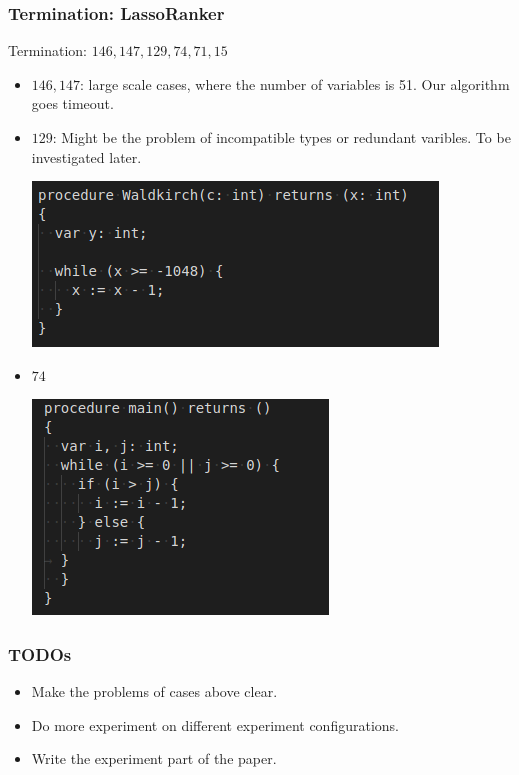 \documentclass[10pt]{beamer}
\begin{document}
\begin{frame}\frametitle{Termination: LassoRanker}
Termination: $146,147,129,74,71,15$
\begin{itemize}
\item $146,147$: large scale cases, where the number of variables is 51. Our algorithm goes timeout.
\item $129$: Might be the problem of incompatible types or redundant varibles. To be investigated later.
\begin{center}
\includegraphics[scale=0.5]{129.png}
\end{center}
\item $74$
\begin{center}
\includegraphics[scale=0.40]{74.png}
\end{center}
\end{itemize}
\end{frame}
\begin{frame}\frametitle{TODOs}
\begin{itemize}
\item Make the problems of cases above clear.
\item Do more experiment on different experiment configurations.
\item Write the experiment part of the paper.
\end{itemize}
\end{frame}
\end{document}
